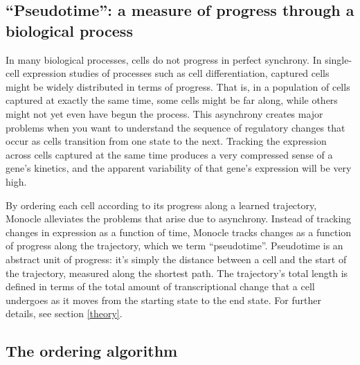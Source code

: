 \documentclass[10pt,oneside]{article}\usepackage[]{graphicx}\usepackage[]{color}
\begin{document}
 \subsection{``Pseudotime'': a measure of progress through a biological process }
 
 In many biological processes, cells do not progress in perfect synchrony.  In single-cell expression studies of processes such as cell differentiation, captured cells might be widely distributed in terms of progress.  That is, in a population of cells captured at exactly the same time, some cells might be far along, while others might not yet even have begun the process.  This asynchrony creates major problems when you want to understand the sequence of regulatory changes that occur as cells transition from one state to the next. Tracking the expression across cells captured at the same time produces a very compressed sense of a gene's kinetics, and the apparent variability of that gene's expression will be very high. 
 
 By ordering each cell according to its progress along a learned trajectory, Monocle alleviates the problems that arise due to asynchrony. Instead of tracking changes in expression as a function of time, Monocle tracks changes as a function of progress along the trajectory, which we term ``pseudotime''. Pseudotime is an abstract unit of progress: it's simply the distance between a cell and the start of the trajectory, measured along the shortest path. The trajectory's total length is defined in terms of the total amount of transcriptional change that a cell undergoes as it moves from the starting state to the end state. For further details, see section \ref{theory}.
 
 \subsection{The ordering algorithm}
 
\end{document}
